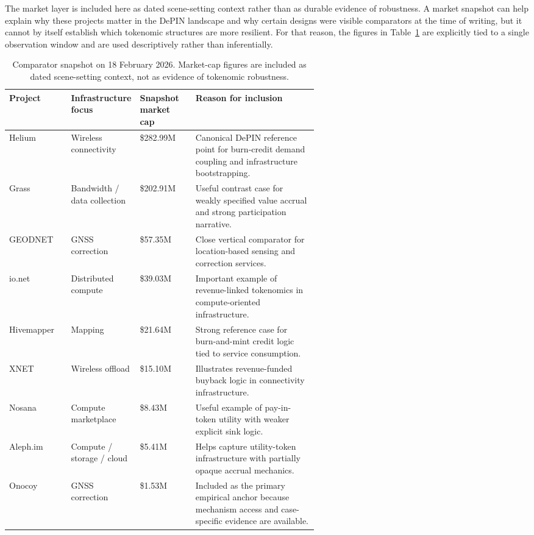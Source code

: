 The market layer is included here as dated scene-setting context rather than as durable evidence of robustness. A market snapshot can help explain why these projects matter in the DePIN landscape and why certain designs were visible comparators at the time of writing, but it cannot by itself establish which tokenomic structures are more resilient. For that reason, the figures in Table~\ref{tab:v2_comparator_snapshot} are explicitly tied to a single observation window and are used descriptively rather than inferentially.

\begin{table}[H]
    \centering
    \small
    \renewcommand{\arraystretch}{1.25}
    \begin{tabularx}{\textwidth}{@{}>{\raggedright\arraybackslash}p{0.20\linewidth} >{\raggedright\arraybackslash}p{0.21\linewidth} >{\raggedright\arraybackslash}p{0.18\linewidth} X@{}}
        \toprule
        \textbf{Project} & \textbf{Infrastructure focus} & \textbf{Snapshot market cap} & \textbf{Reason for inclusion} \\
        \midrule
        Helium & Wireless connectivity & \$282.99M & Canonical DePIN reference point for burn-credit demand coupling and infrastructure bootstrapping. \\
        Grass & Bandwidth / data collection & \$202.91M & Useful contrast case for weakly specified value accrual and strong participation narrative. \\
        GEODNET & GNSS correction & \$57.35M & Close vertical comparator for location-based sensing and correction services. \\
        io.net & Distributed compute & \$39.03M & Important example of revenue-linked tokenomics in compute-oriented infrastructure. \\
        Hivemapper & Mapping & \$21.64M & Strong reference case for burn-and-mint credit logic tied to service consumption. \\
        XNET & Wireless offload & \$15.10M & Illustrates revenue-funded buyback logic in connectivity infrastructure. \\
        Nosana & Compute marketplace & \$8.43M & Useful example of pay-in-token utility with weaker explicit sink logic. \\
        Aleph.im & Compute / storage / cloud & \$5.41M & Helps capture utility-token infrastructure with partially opaque accrual mechanics. \\
        Onocoy & GNSS correction & \$1.53M & Included as the primary empirical anchor because mechanism access and case-specific evidence are available. \\
        \bottomrule
    \end{tabularx}
    \caption[Comparator snapshot (18 February 2026)]{Comparator snapshot on 18 February 2026. Market-cap figures are included as dated scene-setting context, not as evidence of tokenomic robustness.}
    \label{tab:v2_comparator_snapshot}
\end{table}

